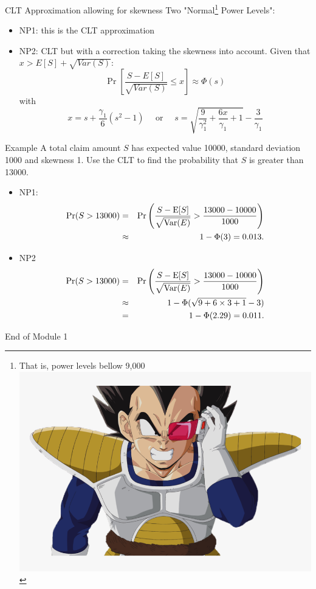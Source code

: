 \documentclass[11pt]{beamer}
\begin{document}
\begin{frame}{CLT Approximation allowing for skewness}
Two "Normal\footnote{That is, power levels bellow 9,000 \includegraphics[scale=0.05]{sad.png}} Power Levels":
\begin{itemize}
\item \alert{NP1}: this is the CLT approximation
\item \alert{NP2}: CLT but with a correction taking the skewness into account. Given that \alert{$x>E[S]+\sqrt{Var(S)}$}:
$$\Pr\left[ \frac{S-E[S] }{\sqrt{Var(S)} }\leq x\right] \approx \Phi \left( s\right)$$
with
$$x=s+\frac{\gamma_1}{6} \left(s^{2}-1\right)\quad\text{ or }\quad s=\sqrt{\frac{9}{\gamma_1 ^{2}}+\frac{6x}{\gamma_1 }+1}-\frac{3}{\gamma_1 }$$
 
\end{itemize}
\end{frame}
\begin{frame}{Example}
A total claim amount $S$ has expected value 10000, standard deviation 1000 and
skewness 1. Use the CLT to find the probability that $S$ is greater than 13000.
\begin{itemize}
\item \alert{NP1}:
\begin{eqnarray*}
\Pr (S > 13000) &=& \Pr \left(\frac{S - {\mbox E}[S]}{\sqrt{\mbox{Var} (E)}} > \frac{13000-10000}{1000} \right)\\
    &\approx&1 - \Phi (3) =0.013 .
    \end{eqnarray*}
\item \alert{NP2}
\begin{eqnarray*}
\Pr (S > 13000) &=& \Pr \left(\frac{S - {\mbox E}[S]}{\sqrt{\mbox{Var} (E)}} > \frac{13000-10000}{1000} \right)\\
    &\approx&1 - \Phi (\sqrt{9+6\times3+1}-3) \\
    &=& 1 - \Phi (2.29) =0.011.
    \end{eqnarray*}
\end{itemize}
\end{frame}
\begin{frame}
\begin{center}
End of Module 1
\end{center}
\end{frame}
\end{document}
